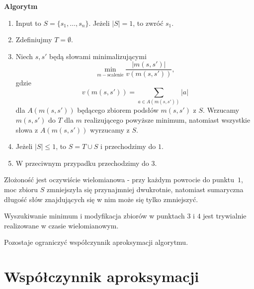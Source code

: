 \documentclass[12pt]{article}
\theoremstyle{plain}
\begin{document}
\textbf{Algorytm}
\begin{enumerate}
    \item Input to $S = \{s_1, \dots, s_n\}$. Jeżeli $|S| = 1$, to zwróć $s_1$.
    \item Zdefiniujmy $T = \emptyset$.
    \item Niech $s, s'$ będą słowami minimalizującymi 
    $$\min_{m - \text{scalenie}} \frac{|m(s, s')|}{v(m(s, s'))},$$
    gdzie 
    $$v(m(s, s')) = \sum_{a\in A(m(s,s'))} |a|$$ 
    dla $A(m(s,s'))$ będącego zbiorem podsłów $m(s,s')$ z $S$. Wrzucamy $m(s, s')$ do $T$ dla $m$ realizującego powyższe minimum, natomiast wszystkie słowa z $A(m(s,s'))$ wyrzucamy z $S$.
    \item Jeżeli $|S| \leq 1$, to $S = T \cup S$ i przechodzimy do $1$.
    \item W przeciwnym przypadku przechodzimy do $3$.
\end{enumerate}

Złożoność jest oczywiście wielomianowa - przy każdym powrocie do punktu~$1$, moc zbioru $S$ zmniejszyła się przynajmniej dwukrotnie, natomiast sumaryczna długość słów znajdujących się w nim może się tylko zmniejszyć.

Wyszukiwanie minimum i modyfikacja zbiorów w punktach $3$ i $4$ jest trywialnie realizowane w czasie wielomianowym.

Pozostaje ograniczyć współczynnik aproksymacji algorytmu.

\section*{Współczynnik aproksymacji}
\end{document}

